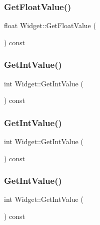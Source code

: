 \subsubsection{\texorpdfstring{GetFloatValue()}{GetFloatValue()}\hspace{0.1cm}{\footnotesize\ttfamily [3/3]}}
{\footnotesize\ttfamily float Widget\+::\+Get\+Float\+Value (\begin{DoxyParamCaption}{ }\end{DoxyParamCaption}) const}

\mbox{\label{class_widget_a15e7d0423020a7a98063a749fb97bdd3}} 
\subsubsection{\texorpdfstring{GetIntValue()}{GetIntValue()}\hspace{0.1cm}{\footnotesize\ttfamily [1/3]}}
{\footnotesize\ttfamily int Widget\+::\+Get\+Int\+Value (\begin{DoxyParamCaption}{ }\end{DoxyParamCaption}) const}

\mbox{\label{class_widget_a15e7d0423020a7a98063a749fb97bdd3}} 
\subsubsection{\texorpdfstring{GetIntValue()}{GetIntValue()}\hspace{0.1cm}{\footnotesize\ttfamily [2/3]}}
{\footnotesize\ttfamily int Widget\+::\+Get\+Int\+Value (\begin{DoxyParamCaption}{ }\end{DoxyParamCaption}) const}

\mbox{\label{class_widget_a15e7d0423020a7a98063a749fb97bdd3}} 
\subsubsection{\texorpdfstring{GetIntValue()}{GetIntValue()}\hspace{0.1cm}{\footnotesize\ttfamily [3/3]}}
{\footnotesize\ttfamily int Widget\+::\+Get\+Int\+Value (\begin{DoxyParamCaption}{ }\end{DoxyParamCaption}) const}

